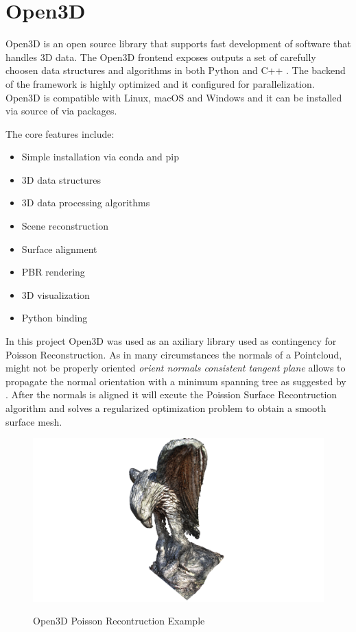 \documentclass[12pt]{report}
\begin{document}
\section{Open3D}
Open3D is an open source library that supports fast development of software that handles 3D data.
The Open3D frontend exposes outputs a set of carefully choosen data structures and algorithms in both Python and C++ . 
The backend of the framework is highly optimized and it configured for parallelization.
Open3D is compatible with Linux, macOS and Windows and it can be installed via source of via packages. 

The core features include: 
\begin{multicols}{2}
  \begin{itemize}
    \item Simple installation via conda and pip
    \item 3D data structures
    \item 3D data processing algorithms
    \item Scene reconstruction
    \item Surface alignment
    \item PBR rendering
    \item 3D visualization
    \item Python binding
  \end{itemize}
  \end{multicols}


In this project Open3D was used as an axiliary library used as contingency for Poisson Reconstruction. 
As in many circumstances the normals of a Pointcloud, might not be properly oriented \textit{orient normals consistent tangent plane} allows to propagate the normal orientation with a minimum
spanning tree as suggested by . 
After the normals is aligned it will  excute the Poission Surface Recontruction algorithm  and solves a regularized optimization problem to obtain a smooth surface mesh. 


\begin{figure}[H]%
  \centering
  \includegraphics[width=1\textwidth]{open3dpoisson.png}
 \caption{Open3D Poisson Recontruction Example}\cite[]{Zhou2018}
 \label{fig:Possion_exampple} 
\end{figure}
\end{document}
